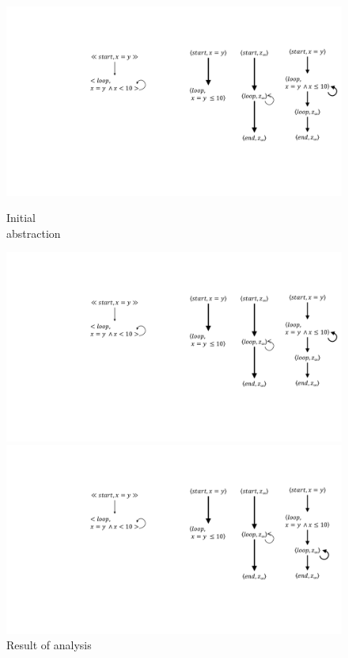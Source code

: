  
 \begin{figure} [h]
 	\centering
 	\begin{minipage} {0.2\linewidth}%
 		\vspace*{10pt}%
 		\includegraphics [width=\textwidth]{include/figures/loop_initial_abst}%
 		\caption{Initial \\ abstraction}
 		\label{fig:loopinitabst}
 	\end{minipage}%
 	\hspace{20pt}	%
 	\begin{minipage} {0.2\linewidth}%
 		\includegraphics [width=\textwidth] {include/figures/loop_first_ref}%
 		\vspace*{103pt}%
 		\caption{Result of analysis}
 		\label{fig:loopanal}
 	\end{minipage}%
 	\hspace{20pt}%
 	\begin{minipage} {0.25\linewidth}%
 		\includegraphics [width=\textwidth] {include/figures/loop_first_abst}%

\end{minipage}
\end{figure}
